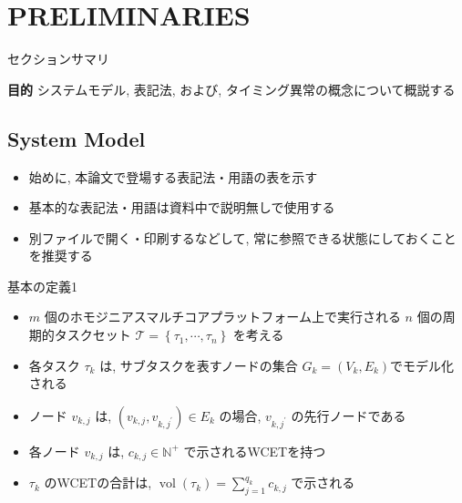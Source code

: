 
\section{PRELIMINARIES}
\label{sec: PRELIMINARIES}

\begin{frame}{セクションサマリ}
    \begin{itembox}[l]{\textbf{目的}}
        システムモデル, 表記法, および, タイミング異常の概念について概説する
    \end{itembox}
\end{frame}


\subsection{System Model}
\label{ssec: system model}

\begin{frame}{}
    \begin{itemize}
        \item 始めに, 本論文で登場する表記法・用語の表を示す
        \item 基本的な表記法・用語は資料中で説明無しで使用する
        \item 別ファイルで開く・印刷するなどして, 常に参照できる状態にしておくことを推奨する
    \end{itemize}
\end{frame}



\begin{frame}{基本の定義1}
    \begin{itemize}
        \item $m$ 個のホモジニアスマルチコアプラットフォーム上で実行される $n$ 個の周期的タスクセット $\mathcal{T}=\left\{\tau_{1}, \cdots, \tau_{n}\right\}$ を考える
        \item 各タスク $\tau_{k}$ は, サブタスクを表すノードの集合 $G_{k}=\left(V_{k}, E_{k}\right)$でモデル化される
        \item ノード $v_{k, j}$ は, $\left(v_{k, j}, v_{k, j^{\prime}}\right) \in E_{k}$ の場合, $v_{k, j^{\prime}}$ の先行ノードである
        \item 各ノード $v_{k, j}$ は, $c_{k, j} \in \mathbb{N}^{+}$ で示されるWCETを持つ
        \item $\tau_{k}$ のWCETの合計は, $\operatorname{vol}\left(\tau_{k}\right)=\sum_{j=1}^{q_{k}} c_{k, j}$ で示される
    \end{itemize}
\end{frame}

